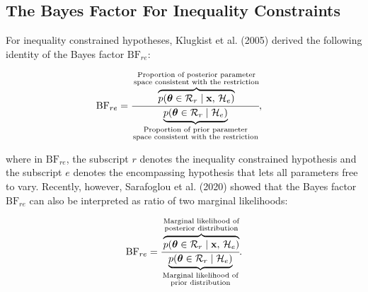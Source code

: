 \documentclass[
  english,
  man,floatsintext]{apa6}
\begin{document}
\hypertarget{the-bayes-factor-for-inequality-constraints}{%
\subsection{The Bayes Factor For Inequality Constraints}\label{the-bayes-factor-for-inequality-constraints}}

For inequality constrained hypotheses, Klugkist et al. (2005) derived the following identity of the Bayes factor \(\text{BF}_{re}\):

\begin{align}
\label{Eq:klugkistIdentity}
\text{BF}_{re} &= \cfrac{\overbrace{p(\boldsymbol{\theta} \in \mathcal{R}_r \mid \mathbf{x}\text{, }\mathcal{H}_e)}^{\substack{\text{Proportion of posterior parameter}\\\text{space consistent with the restriction}}}}{\underbrace{p(\boldsymbol{\theta} \in \mathcal{R}_r \mid  \mathcal{H}_e)}_{\substack{\text{Proportion of prior parameter}\\\text{space consistent with the restriction}}}},
\end{align}

where in \(\text{BF}_{re}\), the subscript \(r\) denotes the inequality constrained hypothesis and the subscript \(e\) denotes the encompassing hypothesis that lets all parameters free to vary. Recently, however, Sarafoglou et al. (2020) showed that the Bayes factor \(\text{BF}_{re}\) can also be interpreted as ratio of two marginal likelihoods:

\begin{align}
\label{Eq:sarafoglouIdentity}
\text{BF}_{re} =
\cfrac{\overbrace{p(\boldsymbol{\theta} \in \mathcal{R}_r \mid \mathbf{x}\text{, }\mathcal{H}_e)}^{\substack{\text{Marginal likelihood of}\\\text{posterior distribution}}}}{\underbrace{p(\boldsymbol{\theta} \in \mathcal{R}_r \mid  \mathcal{H}_e)}_{\substack{\text{Marginal likelihood of}\\\text{prior distribution}}}}.
\end{align}
\end{document}
